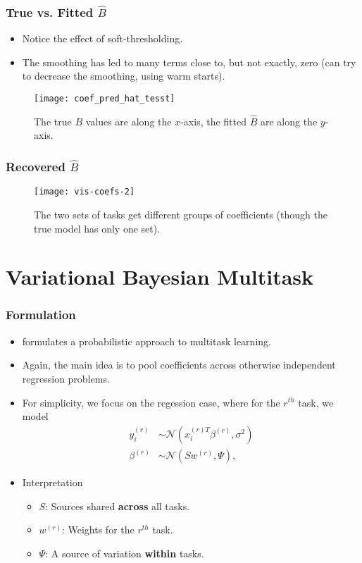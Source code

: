 \documentclass[10pt]{beamer}\usepackage[]{graphicx}\usepackage[]{color}
\def\Gsn{\mathcal{N}}
\begin{document}
\begin{frame}
  \frametitle{True vs. Fitted $\hat{B}$}
  \begin{itemize}
  \item Notice the effect of soft-thresholding.
  \item The smoothing has led to many terms close to, but not exactly,
    zero (can try to decrease the smoothing, using warm starts).
  \end{itemize}
  \begin{figure}
    \texttt{[image: coef\_pred\_hat\_tesst]}
    \caption{The true $B$ values are along the $x$-axis, the fitted $\hat{B}$ are along the $y$-axis.}
  \end{figure}
\end{frame}
\begin{frame}
  \frametitle{Recovered $\hat{B}$}
  \begin{figure}
    \texttt{[image: vis-coefs-2]}
    \caption{The two sets of tasks get different groups of coefficients (though the
    true model has only one set).}
  \end{figure}
\end{frame}

\section{Variational Bayesian Multitask}

\begin{frame}
  \frametitle{Formulation}
  \begin{itemize}
  \item \cite{zhang2005learning} formulates a probabilistic approach to multitask learning.
  \item Again, the main idea is to pool coefficients across otherwise
    independent regression problems.
  \item For simplicity, we focus on the regession case, where for the $r^{th}$
    task, we model
    \begin{align}
      y_{i}^{(r)} &\sim \Gsn\left(x_{i}^{(r) T}\beta^{(r)}, \sigma^{2}\right) \\
      \beta^{(r)} &\sim \Gsn\left(S w^{(r)}, \Psi\right), \label{eq:beta_r_zhang}
    \end{align}
  \item Interpretation
    \begin{itemize}
    \item $S$: Sources shared \textbf{across} all tasks.
    \item $w^{(r)}$: Weights for the $r^{th}$ task.
    \item $\Psi$: A source of variation \textbf{within} tasks.
    \end{itemize}
  \end{itemize}
\end{frame}
\end{document}
